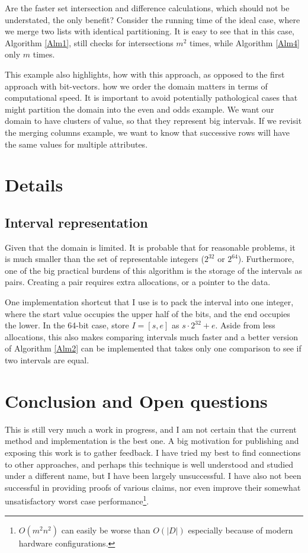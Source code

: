 \documentclass{article}
\begin{document}
Are the faster set intersection and difference calculations,
which should not be understated,
the only benefit?
Consider the running time of the ideal case,
where we merge two lists with identical partitioning.
It is easy to see that in this case,
Algorithm \ref{Alm1},
still checks for intersections $m^{2}$ times,
while Algorithm \ref{Alm4} only $m$ times.

This example also highlights,
how with this approach,
as opposed to the first approach with bit-vectors.
how we order the domain matters in terms of computational speed.
It is important to avoid potentially pathological cases that might
partition the domain into the even and odds example.
We want our domain to have clusters of value,
so that they represent big intervals.
If we revisit the merging columns example,
we want to know that successive rows will have the same values for
multiple attributes.

\section{Details}

\subsection{Interval representation}

Given that the domain is limited.
It is probable that for reasonable problems,
it is much smaller than the set of representable integers ($2^{32}$ or $2^64$).
Furthermore,
one of the big practical burdens of this algorithm is the storage of the intervals
as pairs.
Creating a pair requires extra allocations, or a pointer to the data.

One implementation shortcut that I use is to pack the interval into one integer,
where the start value occupies the upper half of the bits,
and the end occupies the lower.
In the 64-bit case, store $I = [s,e]$ as  $s \cdot 2^{32}+e$.
Aside from less allocations,
this also makes comparing intervals much faster
and a better version of Algorithm \ref{Alm2} can be implemented that
takes only one comparison to see if two intervals are equal.

\section{Conclusion and Open questions}

This is still very much a work in progress,
and I am not certain that the current method and implementation is the best one.
A big motivation for publishing and exposing this work is to gather feedback.
I have tried my best to find connections to other approaches,
and perhaps this technique is well understood and studied under a different name,
but I have been largely unsuccessful.
I have also not been successful in providing proofs of various claims,
nor even improve their somewhat unsatisfactory worst case
performance\footnote{$O(m^{2}n^{2})$ can easily be worse than $O(|D|)$ especially because
of modern hardware configurations.}.
\end{document}
